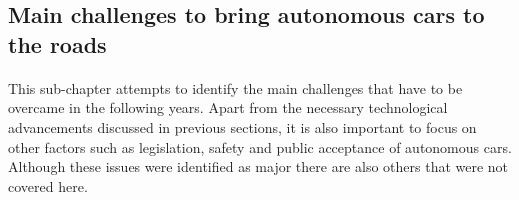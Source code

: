 \documentclass[11pt,english,twoside]{article}
\begin{document}










\subsection{Main challenges to bring autonomous cars to the roads}
\paragraph{}
This sub-chapter attempts to identify the main challenges that have to be overcame in the following years. Apart from the necessary technological advancements discussed in previous sections, it is also important to focus on other factors such as legislation, safety and public acceptance of autonomous cars. Although these issues were identified as major there are also others that were not covered here.
\end{document}
